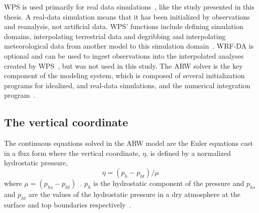 WPS is used primarily for real data simulations~\citep{Wang2015}, like the study presented in this thesis. A real-data simulation means that it has been initialized by observations and reanalysis, not artificial data. WPS' functions include defining simulation domains, interpolating terrestrial data and degribbing and interpolating meteorological data from another model to this simulation domain~\citep{Wang2015}. WRF-DA is optional and can be used to ingest observations into the interpolated analyses created by WPS~\citep{Wang2015}, but was not used in this study. The ARW solver is the key component of the modeling system, which is composed of several initialization programs for idealized, and real-data simulations, and the numerical integration program~\citep{Wang2015}.%

\subsection{The vertical coordinate}
The continuous equations solved in the ARW model are the Euler equations cast in a flux form where the vertical coordinate, $\eta$, is defined by a normalized hydrostatic pressure,
\begin{equation}
\eta = (p_h - p_{ht})/\mu 
\end{equation}
where $\mu = (p_{hs} - p_{ht})$~\citep{Skamarock2008}. $p_h$ is the hydrostatic component of the pressure and $p_{hs}$ and $p_{ht}$ are the values of the hydrostatic pressure in a dry atmosphere at the surface and top boundaries respectively~\citep{Skamarock2008}.

